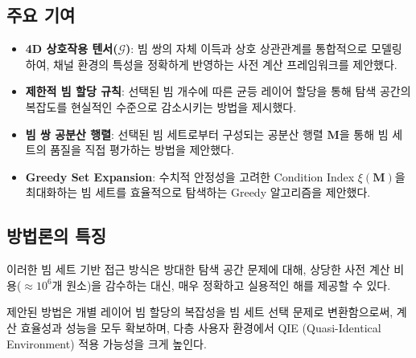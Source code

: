 \documentclass[10pt]{article}
\begin{document}
\subsection{주요 기여}
\begin{itemize}
    \item \textbf{4D 상호작용 텐서($\mathcal{G}$)}: 빔 쌍의 자체 이득과 상호 상관관계를 통합적으로 모델링하여, 채널 환경의 특성을 정확하게 반영하는 사전 계산 프레임워크를 제안했다.
    \item \textbf{제한적 빔 할당 규칙}: 선택된 빔 개수에 따른 균등 레이어 할당을 통해 탐색 공간의 복잡도를 현실적인 수준으로 감소시키는 방법을 제시했다.
    \item \textbf{빔 쌍 공분산 행렬}: 선택된 빔 세트로부터 구성되는 공분산 행렬 $\mathbf{M}$을 통해 빔 세트의 품질을 직접 평가하는 방법을 제안했다.
    \item \textbf{Greedy Set Expansion}: 수치적 안정성을 고려한 Condition Index $\xi(\mathbf{M})$을 최대화하는 빔 세트를 효율적으로 탐색하는 Greedy 알고리즘을 제안했다.
\end{itemize}

\subsection{방법론의 특징}
이러한 빔 세트 기반 접근 방식은 방대한 탐색 공간 문제에 대해, 상당한 사전 계산 비용($\approx 10^6$개 원소)을 감수하는 대신, 매우 정확하고 실용적인 해를 제공할 수 있다.

제안된 방법은 개별 레이어 빔 할당의 복잡성을 빔 세트 선택 문제로 변환함으로써, 계산 효율성과 성능을 모두 확보하며, 다층 사용자 환경에서 QIE (Quasi-Identical Environment) 적용 가능성을 크게 높인다.
\end{document}
